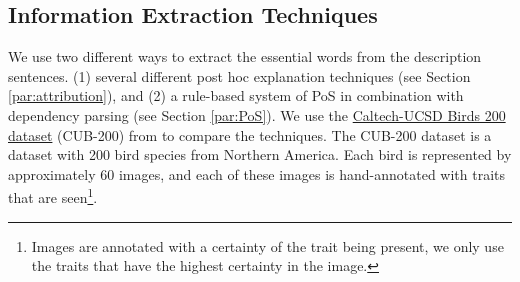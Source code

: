 \documentclass[a4paper, 12pt, oneside]{book} %
\begin{document}

\subsection{Information Extraction Techniques} \label{par:keywords}
We use two different ways to extract the essential words from the description sentences.
(1) several different post hoc explanation techniques (see Section \ref{par:attribution}), and (2) a rule-based system of PoS in combination with dependency parsing (see Section \ref{par:PoS}). 
We use the \href{http://www.vision.caltech.edu/visipedia/CUB-200-2011.html}{Caltech-UCSD Birds 200 dataset} (CUB-200) from  \textcite{welinder_caltech-ucsd_2010} to compare the techniques.
The CUB-200 dataset is a dataset with 200 bird species from Northern America.
Each bird is represented by approximately 60 images, and each of these images is hand-annotated with traits that are seen\footnote{Images are annotated with a certainty of the trait being present, we only use the traits that have the highest certainty in the image.}.
\end{document}
